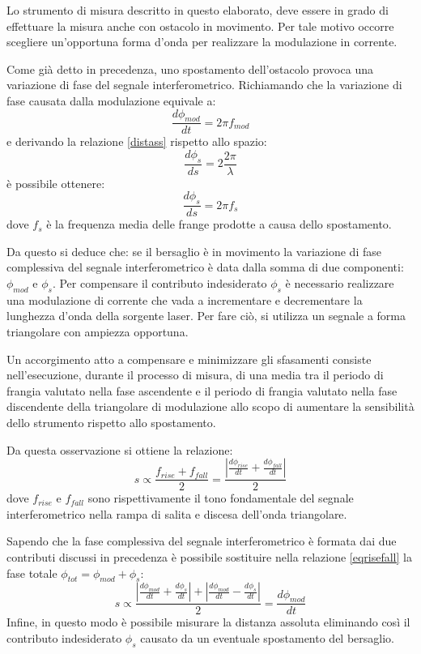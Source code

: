 \begin{enumerate}
	Lo strumento di misura descritto in questo elaborato, deve essere in grado di effettuare la misura anche con ostacolo in movimento. Per tale motivo occorre scegliere un'opportuna forma d'onda per realizzare la modulazione in corrente.
	
	Come già detto in precedenza, uno spostamento dell'ostacolo provoca una variazione di fase del segnale interferometrico. Richiamando che la variazione di fase causata dalla modulazione equivale a:
	\begin{equation}
		\frac{d\phi_{mod}}{dt} = 2 \pi f_{mod}
	\end{equation}
	e derivando la relazione \ref{distass} rispetto allo spazio:
	\begin{equation}
		\frac{d\phi_s}{ds}=2\frac{2\pi}{\lambda}
	\end{equation}
	è possibile ottenere:
	\begin{equation}
		\frac{d\phi_s}{ds}=2\pi f_s
	\end{equation}
	dove $f_s$ è la frequenza media delle frange prodotte a causa dello spostamento.
	
	Da questo si deduce che: se il bersaglio è in movimento la variazione di fase complessiva del segnale interferometrico è data dalla somma di due componenti: $\phi_{mod}$ e $\phi_s$.
	Per compensare il contributo indesiderato $\phi_s$ è necessario realizzare una modulazione di corrente che vada a incrementare e decrementare la lunghezza d'onda della sorgente laser. Per fare ciò, si utilizza un segnale a forma triangolare con ampiezza opportuna.
	
	Un accorgimento atto a compensare e minimizzare gli sfasamenti consiste nell'esecuzione, durante il processo di misura, di una media tra il periodo di frangia valutato nella fase ascendente e il periodo di frangia valutato nella fase discendente della triangolare di modulazione allo scopo di aumentare la sensibilità dello strumento rispetto allo spostamento. 
	
Da questa osservazione si ottiene la relazione:
\begin{equation}
	s \propto \frac{f_{rise}+f_{fall}}{2} = \frac{ \left | \frac{d\phi_{rise}}{dt} + \frac{d\phi_{fall}}{dt} \right |}{2}
	\label{eqrisefall}
\end{equation}
dove $f_{rise}$ e $f_{fall}$ sono rispettivamente il tono fondamentale del segnale interferometrico nella rampa di salita e discesa dell'onda triangolare.

Sapendo che la fase complessiva del segnale interferometrico è formata dai due contributi discussi in precedenza è possibile sostituire nella relazione \ref{eqrisefall} la fase totale $\phi_{tot} = \phi_{mod} + \phi_s$:
\begin{equation}
	s \propto \frac{ \left | \frac{d\phi_{mod}}{dt} + \frac{d\phi_{s}}{dt} \right |+ \left | \frac{d\phi_{mod}}{dt} - \frac{d\phi_{s}}{dt} \right |}{2} = \frac{d\phi_{mod}}{dt}
\end{equation}
Infine, in questo modo è possibile misurare la distanza assoluta eliminando così il contributo indesiderato $\phi_s$ causato da un eventuale spostamento del bersaglio. 


\end{enumerate}

